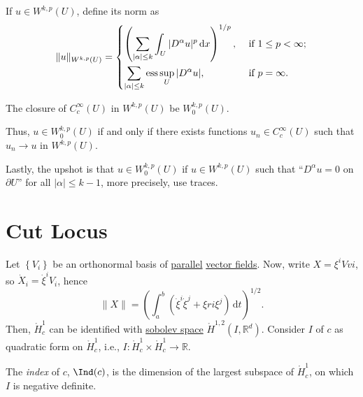 \begin{definition}
	If \(u\in W^{k, p}(U)\), define its norm as
	\[
		\lVert u \rVert_{W^{k, p}(U)} = \begin{dcases}
			\left( \sum_{\vert \alpha \vert \leq k} \int _U \vert D^\alpha u \vert ^p \,\mathrm{d} x \right)^{1 / p} , & \text{ if } 1 \leq p < \infty ; \\
			\sum_{\vert \alpha \vert \leq k} \mathrm{ess} \sup _U \vert D^\alpha u \vert ,                             & \text{ if } p = \infty .
		\end{dcases}
	\]
\end{definition}

\begin{notation}
	The closure of \(C_c^{\infty} (U)\) in \(W^{k, p}(U)\) be \(W_0^{k, p}(U)\).
\end{notation}

Thus, \(u\in W_0^{k, p}(U)\) if and only if there exists functions \(u_n \in C_c^{\infty} (U)\) such that \(u_n \to u\) in \(W^{k, p}(U)\).

\begin{remark}
	Lastly, the upshot is that \(u\in W^{k, p}_0(U)\) if \(u\in W^{k, p}(U)\) such that ``\(D^\alpha u=0\) on \(\partial U\)'' for all \(\vert \alpha \vert \leq k - 1\), more precisely, use traces.
\end{remark}

\section{Cut Locus}
Let \(\left\{ V_i \right\} \) be an orthonormal basis of \hyperref[def:parallel]{parallel} \hyperref[def:vector-field]{vector fields}. Now, write \(X = \xi ^i Vvi\), so \(\dot{X} _i = \dot{\xi }^i V_i \), hence
\[
	\lVert X \rVert = \left( \int_{a}^{b} \left( \dot{\xi }^i \dot{\xi }^j + \xi ri \xi ^j \right)  \,\mathrm{d}t \right) ^{1 / 2}.
\]
Then, \(\mathring{H}_c^1\) can be identified with \hyperref[def:sobolev-space]{sobolev space} \(\mathring{H}^{1, 2}(I, \mathbb{R} ^d)\). Consider \(I\) of \(c\) as quadratic form on \(\mathring{H}^1_c \), i.e., \(I\colon \mathring{H}^1_c \times \mathring{H}^1_c \to \mathbb{R} \).

\begin{definition}[Index]\label{def:index}
	The \emph{index} of \(c\), \(\Ind(c)\), is the dimension of the largest subspace of \(\mathring{H}_c^1\), on which \(I\) is negative definite.
\end{definition}

